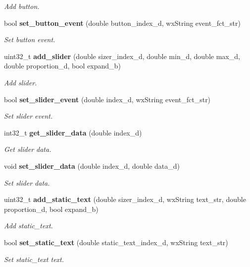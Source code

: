 \begin{DoxyCompactItemize}
\begin{DoxyCompactList}\small\item\em Add button. \end{DoxyCompactList}\item 
bool \textbf{ set\+\_\+button\+\_\+event} (double button\+\_\+index\+\_\+d, wx\+String event\+\_\+fct\+\_\+str)
\begin{DoxyCompactList}\small\item\em Set button event. \end{DoxyCompactList}\item 
uint32\+\_\+t \textbf{ add\+\_\+slider} (double sizer\+\_\+index\+\_\+d, double min\+\_\+d, double max\+\_\+d, double proportion\+\_\+d, bool expand\+\_\+b)
\begin{DoxyCompactList}\small\item\em Add slider. \end{DoxyCompactList}\item 
bool \textbf{ set\+\_\+slider\+\_\+event} (double index\+\_\+d, wx\+String event\+\_\+fct\+\_\+str)
\begin{DoxyCompactList}\small\item\em Set slider event. \end{DoxyCompactList}\item 
int32\+\_\+t \textbf{ get\+\_\+slider\+\_\+data} (double index\+\_\+d)
\begin{DoxyCompactList}\small\item\em Get slider data. \end{DoxyCompactList}\item 
void \textbf{ set\+\_\+slider\+\_\+data} (double index\+\_\+d, double data\+\_\+d)
\begin{DoxyCompactList}\small\item\em Set slider data. \end{DoxyCompactList}\item 
uint32\+\_\+t \textbf{ add\+\_\+static\+\_\+text} (double sizer\+\_\+index\+\_\+d, wx\+String text\+\_\+str, double proportion\+\_\+d, bool expand\+\_\+b)
\begin{DoxyCompactList}\small\item\em Add static\+\_\+text. \end{DoxyCompactList}\item 
bool \textbf{ set\+\_\+static\+\_\+text} (double static\+\_\+text\+\_\+index\+\_\+d, wx\+String text\+\_\+str)
\begin{DoxyCompactList}\small\item\em Set static\+\_\+text text. \end{DoxyCompactList}\item 

\end{DoxyCompactItemize}

